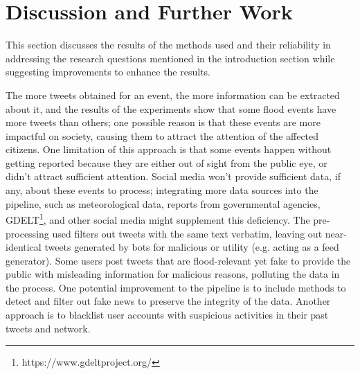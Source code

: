 \chapter{Discussion and Further Work}\label{sec:discussion_and_further_work}

This section discusses the results of the methods used and their reliability in addressing the
research questions mentioned in the introduction section while suggesting improvements to enhance
the results.

The more tweets obtained for an event, the more information can be extracted about it, and the
results of the experiments show that some flood events have more tweets than others; one possible
reason is that these events are more impactful on society, causing them to attract the attention of
the affected citizens. One limitation of this approach is that some events happen without getting
reported because they are either out of sight from the public eye, or didn't attract sufficient
attention. Social media won't provide sufficient data, if any, about these events to process;
integrating more data sources into the pipeline, such as meteorological data, reports from
governmental agencies, \ac{GDELT}\footnote{https://www.gdeltproject.org/}, and other social media
might supplement this deficiency. The pre-processing used filters out tweets with the same text
verbatim, leaving out near-identical tweets generated by bots for malicious or utility (e.g. acting
as a feed generator). Some users post tweets that are flood-relevant yet fake to provide the public
with misleading information for malicious reasons, polluting the data in the process. One potential
improvement to the pipeline is to include methods to detect and filter out fake news to preserve the
integrity of the data. Another approach is to blacklist user accounts with suspicious activities in
their past tweets and network. 

